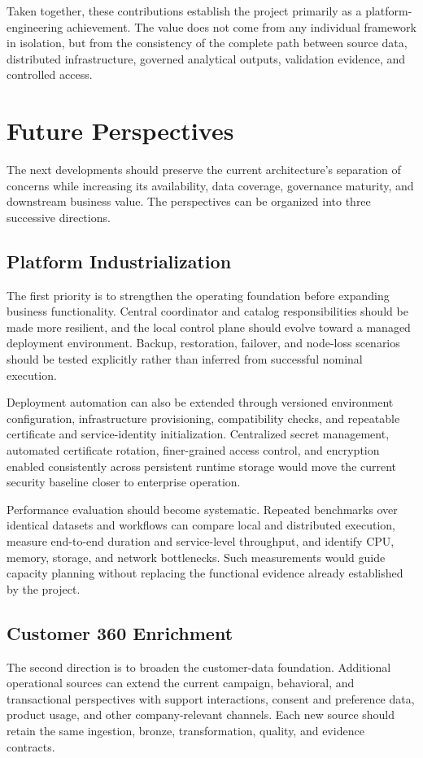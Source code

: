 Taken together, these contributions establish the project primarily as a platform-engineering achievement. The value does not come from any individual framework in isolation, but from the consistency of the complete path between source data, distributed infrastructure, governed analytical outputs, validation evidence, and controlled access.

\section{Future Perspectives}
The next developments should preserve the current architecture's separation of concerns while increasing its availability, data coverage, governance maturity, and downstream business value. The perspectives can be organized into three successive directions.

\subsection{Platform Industrialization}
The first priority is to strengthen the operating foundation before expanding business functionality. Central coordinator and catalog responsibilities should be made more resilient, and the local control plane should evolve toward a managed deployment environment. Backup, restoration, failover, and node-loss scenarios should be tested explicitly rather than inferred from successful nominal execution.

Deployment automation can also be extended through versioned environment configuration, infrastructure provisioning, compatibility checks, and repeatable certificate and service-identity initialization. Centralized secret management, automated certificate rotation, finer-grained access control, and encryption enabled consistently across persistent runtime storage would move the current security baseline closer to enterprise operation.

Performance evaluation should become systematic. Repeated benchmarks over identical datasets and workflows can compare local and distributed execution, measure end-to-end duration and service-level throughput, and identify CPU, memory, storage, and network bottlenecks. Such measurements would guide capacity planning without replacing the functional evidence already established by the project.

\subsection{Customer 360 Enrichment}
The second direction is to broaden the customer-data foundation. Additional operational sources can extend the current campaign, behavioral, and transactional perspectives with support interactions, consent and preference data, product usage, and other company-relevant channels. Each new source should retain the same ingestion, bronze, transformation, quality, and evidence contracts.

